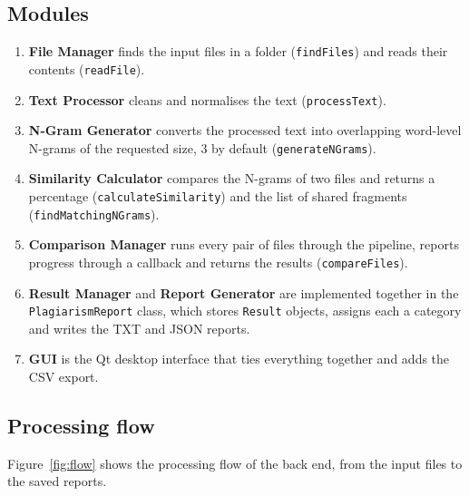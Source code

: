 \documentclass[11pt,a4paper]{report}
\newcommand{\cc}[1]{\texttt{#1}}
\begin{document}
\subsection{Modules}
\begin{enumerate}[nosep]
  \item \textbf{File Manager} finds the input files in a folder (\cc{findFiles}) and reads
        their contents (\cc{readFile}).
  \item \textbf{Text Processor} cleans and normalises the text (\cc{processText}).
  \item \textbf{N-Gram Generator} converts the processed text into overlapping word-level
        N-grams of the requested size, 3 by default (\cc{generateNGrams}).
  \item \textbf{Similarity Calculator} compares the N-grams of two files and returns a
        percentage (\cc{calculateSimilarity}) and the list of shared fragments
        (\cc{findMatchingNGrams}).
  \item \textbf{Comparison Manager} runs every pair of files through the pipeline, reports
        progress through a callback and returns the results (\cc{compareFiles}).
  \item \textbf{Result Manager} and \textbf{Report Generator} are implemented together in
        the \cc{PlagiarismReport} class, which stores \cc{Result} objects, assigns each a
        category and writes the TXT and JSON reports.
  \item \textbf{GUI} is the Qt desktop interface that ties everything together and adds the
        CSV export.
\end{enumerate}

\subsection{Processing flow}
Figure~\ref{fig:flow} shows the processing flow of the back end, from the input files to the
saved reports.
\end{document}
